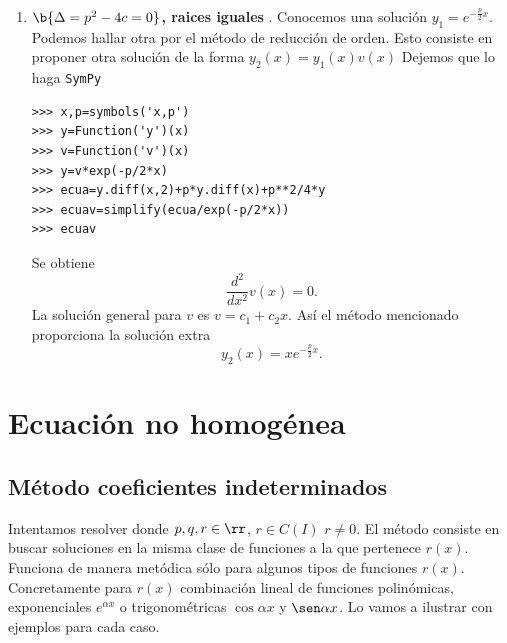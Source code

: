 \begin{enumerate}
\begin{center}
\end{center}








\item \noindent\textbf{ $\b{\Delta=p^2-4c=0}$, raices iguales }. Conocemos una solución $\boxed{y_1=e^{-\frac{p}{2}x}}$. Podemos hallar otra
por el método de reducción de orden. Esto consiste en proponer otra solución de la forma $y_2(x)=y_1(x)v(x)$ Dejemos que lo haga \texttt{SymPy}


\begin{lstlisting}
>>> x,p=symbols('x,p')
>>> y=Function('y')(x)
>>> v=Function('v')(x)
>>> y=v*exp(-p/2*x)
>>> ecua=y.diff(x,2)+p*y.diff(x)+p**2/4*y
>>> ecuav=simplify(ecua/exp(-p/2*x))
>>> ecuav
\end{lstlisting}
Se obtiene
\[\frac{d^{2}}{d x^{2}}  v{\left (x \right )}=0.\]
La solución general para $v$ es $v=c_1+c_2x$. Así el método mencionado proporciona la solución extra
\[\boxed{y_2(x)=xe^{-\frac{p}{2}x}}.\]
\end{enumerate}


\section{Ecuación no homogénea}
\subsection{Método coeficientes indeterminados}
Intentamos resolver
donde $p,q,r \in \rr$, $r\in C(I)$ $r\neq 0$. El método consiste en buscar soluciones en la misma clase de funciones a la que pertenece $r(x)$. Funciona de manera metódica sólo para algunos tipos de funciones $r(x)$.
Concretamente para $r(x)$ combinación lineal de funciones polinómicas, exponenciales $e^{\alpha x}$ o trigonométricas $\cos \alpha x$ y $\sen \alpha x$.
Lo vamos a ilustrar con ejemplos para cada caso.



